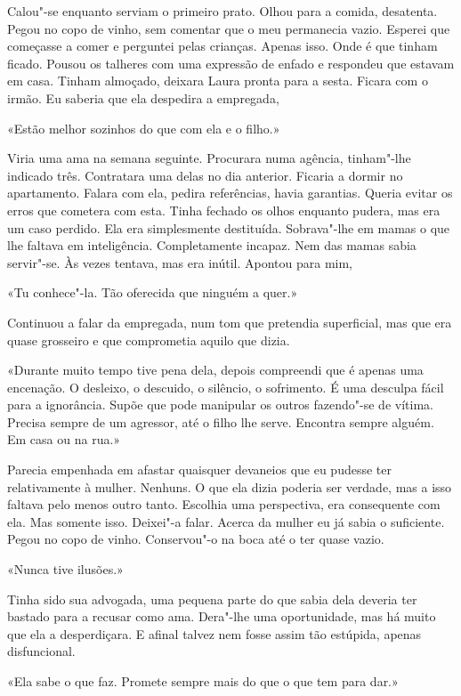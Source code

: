Calou"-se enquanto serviam o primeiro prato. Olhou para a comida,
desatenta. Pegou no copo de vinho, sem comentar que o meu permanecia
vazio. Esperei que começasse a comer e perguntei pelas crianças. Apenas
isso. Onde é que tinham ficado. Pousou os talheres com uma expressão de
enfado e respondeu que estavam em casa. Tinham almoçado, deixara Laura
pronta para a sesta. Ficara com o irmão. Eu saberia que ela despedira a
empregada,

«Estão melhor sozinhos do que com ela e o filho.»

Viria uma ama na semana seguinte. Procurara numa agência, tinham"-lhe
indicado três. Contratara uma delas no dia anterior. Ficaria a dormir no
apartamento. Falara com ela, pedira referências, havia garantias. Queria
evitar os erros que cometera com esta. Tinha fechado os olhos enquanto
pudera, mas era um caso perdido. Ela era simplesmente destituída.
Sobrava"-lhe em mamas o que lhe faltava em inteligência. Completamente
incapaz. Nem das mamas sabia servir"-se. Às vezes tentava, mas era
inútil. Apontou para mim,

«Tu conhece"-la. Tão oferecida que ninguém a quer.»

Continuou a falar da empregada, num tom que pretendia superficial, mas
que era quase grosseiro e que comprometia aquilo que dizia.

«Durante muito tempo tive pena dela, depois compreendi que é apenas uma
encenação. O desleixo, o descuido, o silêncio, o sofrimento. É uma
desculpa fácil para a ignorância. Supõe que pode manipular os outros
fazendo"-se de vítima. Precisa sempre de um agressor, até o filho lhe
serve. Encontra sempre alguém. Em casa ou na rua.»

Parecia empenhada em afastar quaisquer devaneios que eu pudesse ter
relativamente à mulher. Nenhuns. O que ela dizia poderia ser verdade,
mas a isso faltava pelo menos outro tanto. Escolhia uma perspectiva, era
consequente com ela. Mas somente isso. Deixei"-a falar. Acerca da mulher
eu já sabia o suficiente. Pegou no copo de vinho. Conservou"-o na boca
até o ter quase vazio.

«Nunca tive ilusões.»

Tinha sido sua advogada, uma pequena parte do que sabia dela deveria ter
bastado para a recusar como ama. Dera"-lhe uma oportunidade, mas há
muito que ela a desperdiçara. E afinal talvez nem fosse assim tão
estúpida, apenas disfuncional.

«Ela sabe o que faz. Promete sempre mais do que o que tem para dar.»


